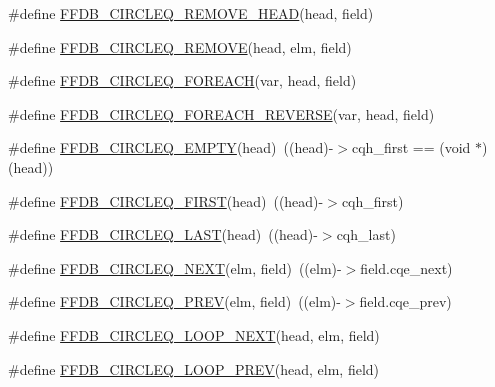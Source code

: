 \begin{DoxyCompactItemize}
\item 
\#define \mbox{\hyperlink{adat-devel_2other__libs_2filedb_2filehash_2ffdb__cq_8h_a1d868c968877a554c51641419ac02621}{F\+F\+D\+B\+\_\+\+C\+I\+R\+C\+L\+E\+Q\+\_\+\+R\+E\+M\+O\+V\+E\+\_\+\+H\+E\+AD}}(head,  field)
\item 
\#define \mbox{\hyperlink{adat-devel_2other__libs_2filedb_2filehash_2ffdb__cq_8h_ab6b5bebfa767832844cc276764fe4b60}{F\+F\+D\+B\+\_\+\+C\+I\+R\+C\+L\+E\+Q\+\_\+\+R\+E\+M\+O\+VE}}(head,  elm,  field)
\item 
\#define \mbox{\hyperlink{adat-devel_2other__libs_2filedb_2filehash_2ffdb__cq_8h_af08df310a24a3091bf7c6c7bb4b49558}{F\+F\+D\+B\+\_\+\+C\+I\+R\+C\+L\+E\+Q\+\_\+\+F\+O\+R\+E\+A\+CH}}(var,  head,  field)
\item 
\#define \mbox{\hyperlink{adat-devel_2other__libs_2filedb_2filehash_2ffdb__cq_8h_a98a60f27efeb4f5f4ccdab1199d0e0f7}{F\+F\+D\+B\+\_\+\+C\+I\+R\+C\+L\+E\+Q\+\_\+\+F\+O\+R\+E\+A\+C\+H\+\_\+\+R\+E\+V\+E\+R\+SE}}(var,  head,  field)
\item 
\#define \mbox{\hyperlink{adat-devel_2other__libs_2filedb_2filehash_2ffdb__cq_8h_a65ad566b610663661270032cbc4de6d2}{F\+F\+D\+B\+\_\+\+C\+I\+R\+C\+L\+E\+Q\+\_\+\+E\+M\+P\+TY}}(head)~((head)-\/$>$cqh\+\_\+first == (void $\ast$)(head))
\item 
\#define \mbox{\hyperlink{adat-devel_2other__libs_2filedb_2filehash_2ffdb__cq_8h_ae2641b416d8dadee0243c42f07148735}{F\+F\+D\+B\+\_\+\+C\+I\+R\+C\+L\+E\+Q\+\_\+\+F\+I\+R\+ST}}(head)~((head)-\/$>$cqh\+\_\+first)
\item 
\#define \mbox{\hyperlink{adat-devel_2other__libs_2filedb_2filehash_2ffdb__cq_8h_a8a0be66191e48dc80600d4d285617dd4}{F\+F\+D\+B\+\_\+\+C\+I\+R\+C\+L\+E\+Q\+\_\+\+L\+A\+ST}}(head)~((head)-\/$>$cqh\+\_\+last)
\item 
\#define \mbox{\hyperlink{adat-devel_2other__libs_2filedb_2filehash_2ffdb__cq_8h_a709f12ab85a001a215c3b886ecc70269}{F\+F\+D\+B\+\_\+\+C\+I\+R\+C\+L\+E\+Q\+\_\+\+N\+E\+XT}}(elm,  field)~((elm)-\/$>$field.\+cqe\+\_\+next)
\item 
\#define \mbox{\hyperlink{adat-devel_2other__libs_2filedb_2filehash_2ffdb__cq_8h_a226485de8e066a661a6ce61802a7376d}{F\+F\+D\+B\+\_\+\+C\+I\+R\+C\+L\+E\+Q\+\_\+\+P\+R\+EV}}(elm,  field)~((elm)-\/$>$field.\+cqe\+\_\+prev)
\item 
\#define \mbox{\hyperlink{adat-devel_2other__libs_2filedb_2filehash_2ffdb__cq_8h_a26de436c16250565b9360e4a0704ee17}{F\+F\+D\+B\+\_\+\+C\+I\+R\+C\+L\+E\+Q\+\_\+\+L\+O\+O\+P\+\_\+\+N\+E\+XT}}(head,  elm,  field)
\item 
\#define \mbox{\hyperlink{adat-devel_2other__libs_2filedb_2filehash_2ffdb__cq_8h_a2bcb84479caa01dcca1ef942f792cd23}{F\+F\+D\+B\+\_\+\+C\+I\+R\+C\+L\+E\+Q\+\_\+\+L\+O\+O\+P\+\_\+\+P\+R\+EV}}(head,  elm,  field)
\end{DoxyCompactItemize}


